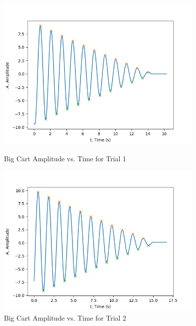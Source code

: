 \begin{figure}[H]
    \centering
    \begin{minipage}{0.45\textwidth}
        \centering
        \includegraphics[width=0.9\textwidth]{Sections/Figures/damping_ratio_big_cart_1.png}
        \caption{Big Cart Amplitude vs. Time for Trial 1}
        \label{fig:Big Cart Amplitude vs. Time Trial 1}
    \end{minipage}\qquad
    \begin{minipage}{0.45\textwidth}
        \centering
        \includegraphics[width=0.9\textwidth]{Sections/Figures/damping_ratio_big_cart_2.png}
        \caption{Big Cart Amplitude vs. Time for Trial 2}
        \label{fig:Big Cart Amplitude vs. Time Trial 2}
    \end{minipage}
\end{figure}
